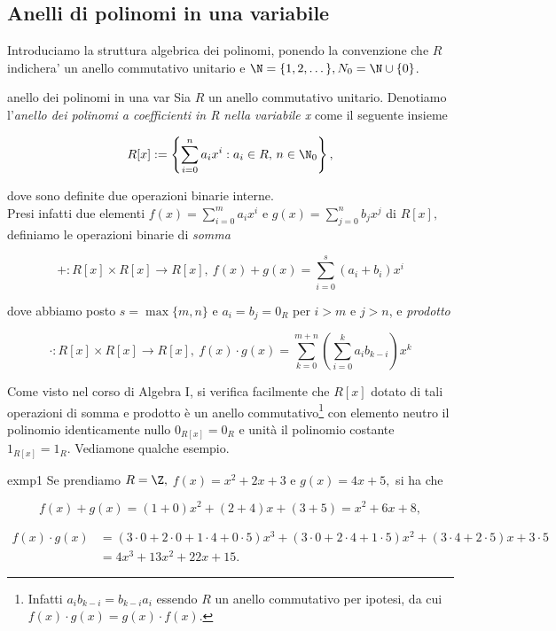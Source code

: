 
\vspace{1.75mm}
\subsection{Anelli di polinomi in una variabile}

Introduciamo la struttura algebrica dei polinomi, ponendo la convenzione che 
$R$ indichera' un anello commutativo unitario e $\N = \{1,2,\dots\}, N_0 = \N\cup\{0\}$.

\begin{defn}{anello dei polinomi in una var}
Sia $R$ un anello commutativo unitario. Denotiamo l'\emph{anello dei polinomi a coefficienti in R
nella variabile x} come il seguente insieme 

\[ R[x]:=\left\{\sum\limits_{i=0}^n a_i x^i : a_i\in R,\, n\in \N_0\right\}, \]

\noindent dove sono definite due operazioni binarie interne. \\
Presi infatti due elementi 
$f(x)=\sum\limits_{i=0}^m a_i x^i$ e $g(x)=\sum\limits_{j=0}^n b_j x^j$ di $R[x],$ 
definiamo le operazioni binarie di \emph{somma} 

\[ + : R[x] \times R[x] \to R[x],\ f(x)+g(x)=\sum\limits_{i=0}^s (a_i+b_i)x^i \] 

\noindent dove abbiamo posto $s=\max\{m,n\}$ e $a_i=b_j=0_R$ per $i>m$ e $j>n$, e \emph{prodotto}

\[ \cdot : R[x] \times R[x] \to R[x],\ f(x)\cdot g(x)=\sum\limits_{k=0}^{m+n} \left(\sum\limits_{i=0}^{k}a_i b_{k-i}\right) x^k\] 
\end{defn}

\noindent Come visto nel corso di Algebra I, si verifica facilmente che $R[x]$ dotato di tali operazioni di somma e prodotto 
è un anello commutativo\footnote{Infatti $a_ib_{k-i}=b_{k-i}a_i$ essendo $R$ un anello commutativo per ipotesi, 
da cui $f(x)\cdot g(x)=g(x)\cdot f(x)$.} con elemento neutro il polinomio identicamente nullo $0_{R[x]}=0_{R}$ 
e unità il polinomio costante $1_{R[x]}=1_{R}$. Vediamone qualche esempio.


\begin{example}[]{exmp1}
Se prendiamo $R=\Z,$ $f(x)=x^2+2x+3$ e $g(x)=4x+5,$ si ha che 

\[ f(x)+g(x)=(1+0)x^2+(2+4)x+(3+5)=x^2+6x+8, \] 

{\setlength{\belowdisplayskip}{-2pt}\setlength{\abovedisplayskip}{0pt}
\begin{align*}
f(x)\cdot g(x) 
  &= (3\cdot 0+2\cdot 0+1\cdot 4+0\cdot 5)x^3+(3\cdot 0+2\cdot 4+1\cdot 5)x^2+(3\cdot 4+2\cdot 5)x+3\cdot 5 \\ 
  &= 4x^3+13x^2+22x+15. \ 
\end{align*}}
\end{example}


